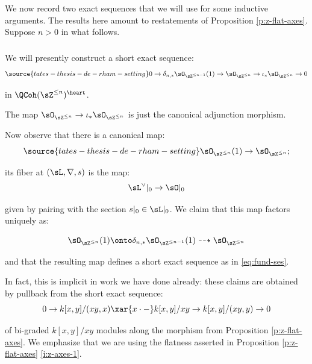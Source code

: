 We now record two exact sequences that we will use for some inductive arguments.
The results here amount to restatements of Proposition \ref{p:z-flat-axes}.
Suppose $n > 0$ in what follows.

\subsubsection{}

We will presently construct a short exact sequence:
%
\begin{equation}\label{eq:fund-ses}
\source{tates-thesis-de-rham-setting}
0 \to \delta_{n,*}\sO_{\sZ^{\leq n-1}}(1)
\to \sO_{\sZ^{\leq n}} \to \iota_*\sO_{\sZ^{\leq n}} \to 0
\end{equation}

 in $\QCoh(\sZ^{\leq n})^{\heart}$.

The map $\sO_{\sZ^{\leq n}} \to \iota_*\sO_{\sZ^{\leq n}}$ is just the
canonical adjunction morphism.

Now observe that there is a canonical map:
%
\begin{equation}\label{eq:o(1)}
\source{tates-thesis-de-rham-setting}
\sO_{\sZ^{\leq n}}(1) \to \sO_{\sZ^{\leq n}};
\end{equation}

 its fiber at $(\sL,\nabla,s)$ is the map:
%
\[
\sL^{\vee}|_0 \to \sO|_0
\]

 given by pairing with the section $s|_0 \in \sL|_0$.
We claim that this map factors uniquely as:

\[
\sO_{\sZ^{\leq n}}(1) \onto \delta_{n,*}\sO_{\sZ^{\leq n-1}}(1)
\dashrightarrow \sO_{\sZ^{\leq n}}
\]

 and that the resulting map defines a short exact sequence
as in \eqref{eq:fund-ses}.

In fact, this is implicit in work we have done already: these claims are
obtained by pullback from the short exact sequence:
%
\[
0 \to k[x,y]/(xy,x) \xar{x \cdot -} k[x,y]/xy \to k[x,y]/(xy,y) \to 0
\]

 of bi-graded $k[x,y]/xy$ modules along the morphism
from Proposition \ref{p:z-flat-axes}. We emphasize that we are using the
flatness asserted in Proposition \ref{p:z-flat-axes} \eqref{i:z-axes-1}.

